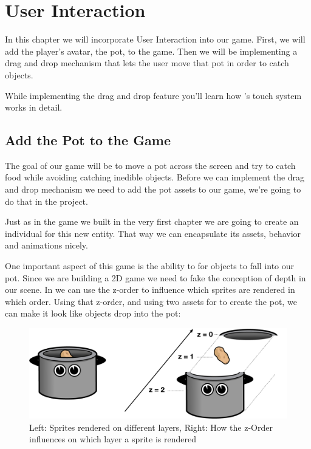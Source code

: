\chapter{User Interaction}

In this chapter we will incorporate User Interaction into our game. First, we
will add the player's avatar, the pot, to the game. Then we will be
implementing a drag and drop mechanism that lets the user move that pot in order
to catch objects.

While implementing the drag and drop feature you'll learn how \cocos{}'s touch
system works in detail.

\section{Add the Pot to the Game}
The goal of our game will be to move a pot across the screen and try to catch
food while avoiding catching inedible objects. Before we can
implement the drag and drop mechanism we need to add the pot assets to our game,
we're going to do that in the \SB{} project.

Just as in the game we built in the very first chapter we are going to create an
individual \ccbfile{} for this new entity. That way we can encapsulate its
assets, behavior and animations nicely.

One important aspect of this game is the ability to for objects to fall into
our pot. Since we are building a 2D game we need to fake the conception of depth
in our scene. In \cocos{} we can use the z-order to influence which sprites are
rendered in which order. Using that z-order, and using two assets for to create
the pot, we can make it look like objects drop into the pot:

\begin{figure}[H]
    \centering
    \includegraphics[width=0.9\linewidth]{images/Chapter3/drawing_order.png}
    \caption{Left: Sprites rendered on different layers, Right: How the z-Order
    influences on which layer a sprite is rendered}
\end{figure}


